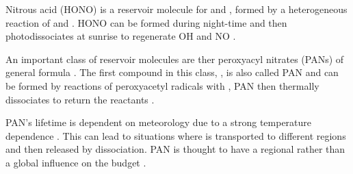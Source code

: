 Nitrous acid (HONO) is a reservoir molecule for  and , formed by a heterogeneous reaction of  and 
. HONO can be formed during night-time and then photodissociates at sunrise to regenerate OH and NO 
\citep{Seinfeld:2006}.
\begin{reactionlist}
\end{reactionlist}

An important class of reservoir molecules are ther peroxyacyl nitrates (PANs) of general formula . The first 
compound in this class, , is also called PAN and can be formed by reactions of peroxyacetyl radicals with 
, PAN then thermally dissociates to return the reactants \citep{Kleinman:2005}.
\begin{reactionlist}
\end{reactionlist}
PAN's lifetime is dependent on meteorology due to a strong temperature dependence \citep{Moxim:1996}. This can lead to 
situations where  is transported to different regions and then released by dissociation. PAN is thought to have a 
regional rather than a global influence on the  budget \citep{Moxim:1996}.

